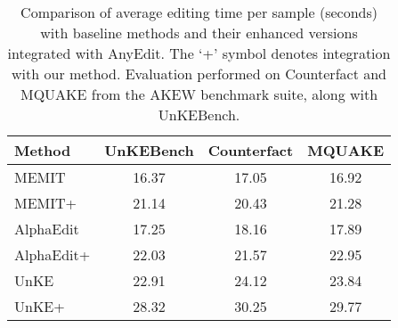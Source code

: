 \begin{table}[htbp]
\centering
\caption{Comparison of average editing time per sample (seconds) with baseline methods and their enhanced versions integrated with AnyEdit. The `+' symbol denotes integration with our method. Evaluation performed on Counterfact and MQUAKE from the AKEW benchmark suite, along with UnKEBench.}
\label{tab:exp_2}
\begin{tabular}{@{}l S[table-format=2.2] S[table-format=2.2] S[table-format=2.2]@{}}
\toprule
\textbf{Method} & \textbf{UnKEBench} & \textbf{Counterfact} & \textbf{MQUAKE} \\
\midrule
MEMIT          & 16.37 & 17.05 & 16.92 \\
MEMIT+         & 21.14 & 20.43 & 21.28 \\
AlphaEdit      & 17.25 & 18.16 & 17.89 \\
AlphaEdit+     & 22.03 & 21.57 & 22.95 \\
UnKE           & 22.91 & 24.12 & 23.84 \\
UnKE+          & 28.32 & 30.25 & 29.77 \\
\bottomrule
\end{tabular}
\end{table}